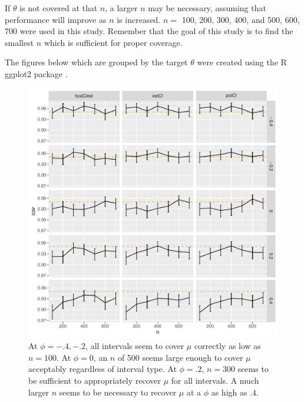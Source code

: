 \documentclass[12pt, letterpaper, titlepage]{article}
\begin{document}
If $\theta$ is not covered at that $n$, a larger $n$ may be
necessary, assuming that performance will improve as $n$ is increased. $n =$
100, 200, 300, 400, and 500, 600, 700 were used in this study. Remember that
the goal of this study is to find the smallest $n$ which is sufficient for
proper coverage. 


The figures below which are grouped by the target $\theta$  were created using
the R ggplot2 package \citep{ggplot2}.


\begin{figure}[tbp]
  \centering
  \includegraphics[width=\textwidth]{figures/plot_mu}
  \caption{At $\phi = -.4, -.2$, all intervals seem to cover $\mu$ correctly
    as low as $n = 100$. At $\phi = 0$, an $n$ of 500 seems large enough to
    cover $\mu$ acceptably regardless of interval type. At $\phi = .2$,
    $n = 300$ seems to be sufficient to appropriately recover $\mu$ for all
    intervals. A much larger $n$ seems to be necessary to recover $\mu$ at a
    $\phi$ as high as $.4$.}
  \label{fig:plot_mu}
\end{figure}
\end{document}
